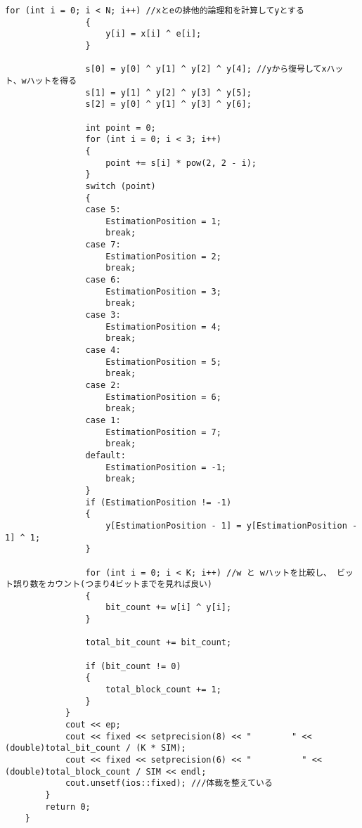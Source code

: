 \documentclass[12pt]{jarticle}
\begin{document}
\begin{lstlisting}[style = lstcpp,caption=kadai3\_3.cpp]
                for (int i = 0; i < N; i++) //xとeの排他的論理和を計算してyとする
                {
                    y[i] = x[i] ^ e[i];
                }
    
                s[0] = y[0] ^ y[1] ^ y[2] ^ y[4]; //yから復号してxハット、wハットを得る
                s[1] = y[1] ^ y[2] ^ y[3] ^ y[5];
                s[2] = y[0] ^ y[1] ^ y[3] ^ y[6];
    
                int point = 0;
                for (int i = 0; i < 3; i++)
                {
                    point += s[i] * pow(2, 2 - i);
                }
                switch (point)
                {
                case 5:
                    EstimationPosition = 1;
                    break;
                case 7:
                    EstimationPosition = 2;
                    break;
                case 6:
                    EstimationPosition = 3;
                    break;
                case 3:
                    EstimationPosition = 4;
                    break;
                case 4:
                    EstimationPosition = 5;
                    break;
                case 2:
                    EstimationPosition = 6;
                    break;
                case 1:
                    EstimationPosition = 7;
                    break;
                default:
                    EstimationPosition = -1;
                    break;
                }
                if (EstimationPosition != -1)
                {
                    y[EstimationPosition - 1] = y[EstimationPosition - 1] ^ 1;
                }
    
                for (int i = 0; i < K; i++) //w と wハットを比較し、 ビット誤り数をカウント(つまり4ビットまでを見れば良い)
                {
                    bit_count += w[i] ^ y[i];
                }
    
                total_bit_count += bit_count;
    
                if (bit_count != 0)
                {
                    total_block_count += 1;
                }
            }
            cout << ep;
            cout << fixed << setprecision(8) << "        " << (double)total_bit_count / (K * SIM);
            cout << fixed << setprecision(6) << "          " << (double)total_block_count / SIM << endl;
            cout.unsetf(ios::fixed); ///体裁を整えている
        }
        return 0;
    }
    
\end{lstlisting}

\end{document}
